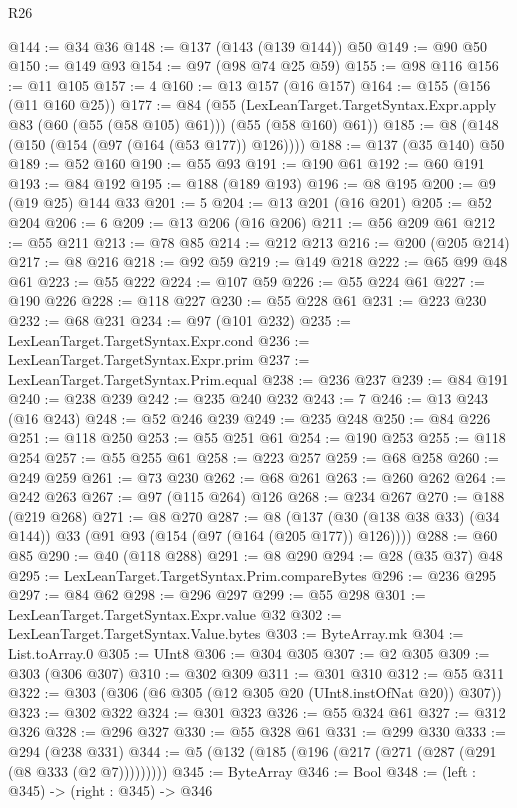 \begin{lexlean}{R26}
\begin{coremodule}
{{{{{{{{{{{{{{{@144 := @34 @36
@148 := @137 (@143 (@139 @144)) @50
@149 := @90 @50
@150 := @149 @93
@154 := @97 (@98 @74 @25 @59)
@155 := @98 @116
@156 := @11 @105
@157 := 4
@160 := @13 @157 (@16 @157)
@164 := @155 (@156 (@11 @160 @25))
@177 := @84
    (@55
      (LexLeanTarget.TargetSyntax.Expr.apply @83 (@60 (@55 (@58 @105) @61)))
      (@55 (@58 @160) @61))
@185 := @8 (@148 (@150 (@154 (@97 (@164 (@53 @177)) @126))))
@188 := @137 (@35 @140) @50
@189 := @52 @160
@190 := @55 @93
@191 := @190 @61
@192 := @60 @191
@193 := @84 @192
@195 := @188 (@189 @193)
@196 := @8 @195
@200 := @9 (@19 @25) @144 @33
@201 := 5
@204 := @13 @201 (@16 @201)
@205 := @52 @204
@206 := 6
@209 := @13 @206 (@16 @206)
@211 := @56 @209 @61
@212 := @55 @211
@213 := @78 @85
@214 := @212 @213
@216 := @200 (@205 @214)
@217 := @8 @216
@218 := @92 @59
@219 := @149 @218
@222 := @65 @99 @48 @61
@223 := @55 @222
@224 := @107 @59
@226 := @55 @224 @61
@227 := @190 @226
@228 := @118 @227
@230 := @55 @228 @61
@231 := @223 @230
@232 := @68 @231
@234 := @97 (@101 @232)
@235 := LexLeanTarget.TargetSyntax.Expr.cond
@236 := LexLeanTarget.TargetSyntax.Expr.prim
@237 := LexLeanTarget.TargetSyntax.Prim.equal
@238 := @236 @237
@239 := @84 @191
@240 := @238 @239
@242 := @235 @240 @232
@243 := 7
@246 := @13 @243 (@16 @243)
@248 := @52 @246 @239
@249 := @235 @248
@250 := @84 @226
@251 := @118 @250
@253 := @55 @251 @61
@254 := @190 @253
@255 := @118 @254
@257 := @55 @255 @61
@258 := @223 @257
@259 := @68 @258
@260 := @249 @259
@261 := @73 @230
@262 := @68 @261
@263 := @260 @262
@264 := @242 @263
@267 := @97 (@115 @264) @126
@268 := @234 @267
@270 := @188 (@219 @268)
@271 := @8 @270
@287 := @8 (@137 (@30 (@138 @38 @33) (@34 @144)) @33 (@91 @93 (@154 (@97 (@164 (@205 @177)) @126))))
@288 := @60 @85
@290 := @40 (@118 @288)
@291 := @8 @290
@294 := @28 (@35 @37) @48
@295 := LexLeanTarget.TargetSyntax.Prim.compareBytes
@296 := @236 @295
@297 := @84 @62
@298 := @296 @297
@299 := @55 @298
@301 := LexLeanTarget.TargetSyntax.Expr.value @32
@302 := LexLeanTarget.TargetSyntax.Value.bytes
@303 := ByteArray.mk
@304 := List.toArray.{0}
@305 := UInt8
@306 := @304 @305
@307 := @2 @305
@309 := @303 (@306 @307)
@310 := @302 @309
@311 := @301 @310
@312 := @55 @311
@322 := @303 (@306 (@6 @305 (@12 @305 @20 (UInt8.instOfNat @20)) @307))
@323 := @302 @322
@324 := @301 @323
@326 := @55 @324 @61
@327 := @312 @326
@328 := @296 @327
@330 := @55 @328 @61
@331 := @299 @330
@333 := @294 (@238 @331)
@344 := @5 (@132 (@185 (@196 (@217 (@271 (@287 (@291 (@8 @333 (@2 @7)))))))))
@345 := ByteArray
@346 := Bool
@348 := (left : @345) -> (right : @345) -> @346
}}}}}}}}}}}}}}}
\end{coremodule}
\end{lexlean}
